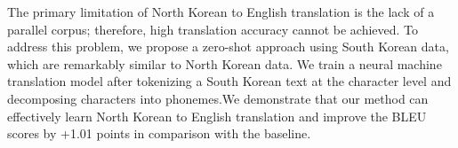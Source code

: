 The primary limitation of North Korean to English translation is the lack of a parallel corpus; therefore, high translation accuracy cannot be achieved. To address this problem, we propose a zero-shot approach using South Korean data, which are remarkably similar to North Korean data. We train a neural machine translation model after tokenizing a South Korean text at the character level and decomposing characters into phonemes.We demonstrate that our method can effectively learn North Korean to English translation and improve the BLEU scores by +1.01 points in comparison with the baseline.
